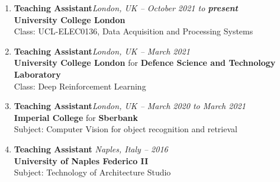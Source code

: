 \begin{enumerate}[leftmargin=0.45cm, itemsep=0.4em, topsep=0.5em, parsep=0.2em]
    \item
    \textbf{Teaching Assistant}\hfill	\textit{London, UK -- October 2021 to \textbf{present}}  \\
    \textbf{University College London} \\
    Class: UCL-ELEC0136, Data Acquisition and Processing Systems

    \item
    \textbf{Teaching Assistant}\hfill	\textit{London, UK -- March 2021} \\
    \textbf{University College London} for \textbf{Defence Science and Technology Laboratory} \\
    Class: Deep Reinforcement Learning

    \item
    \textbf{Teaching Assistant}\hfill	\textit{London, UK -- March 2020 to March 2021} \\
    \textbf{Imperial College} for \textbf{Sberbank} \\
    Subject: Computer Vision for object recognition and retrieval

    \item
    \textbf{Teaching Assistant} \hfill \textit{Naples, Italy -- 2016} \\
    \textbf{University of Naples Federico II} \\
    Subject: Technology of Architecture Studio
\end{enumerate}